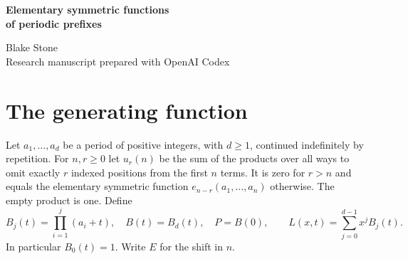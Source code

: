 \documentclass[11pt,letterpaper]{article}
\begin{document}
\thispagestyle{plain}
\begin{center}
{\LARGE\bfseries Elementary symmetric functions\\[0.15em] of periodic prefixes\par}
\vspace{0.6em}
Blake Stone\\
{\small Research manuscript prepared with OpenAI Codex}
\end{center}
\begin{abstract}
For a periodic list of positive integers, sum the products obtained by omitting a fixed number $r$ of positions from each prefix. We give the generating function and an exact recurrence order when the period product defines an irreducible binomial. Specialization to one omitted position establishes ten generating functions and recurrences proposed by R. J. Mathar for sequences of Clark Kimberling. One of the ten cases was verified by Robert Israel in 2017. For each of the ten periods the least order at any omission count $r$ is $d(r+1)$, where $d$ is the period length.
\end{abstract}

\section{The generating function}
Let $a_1,\ldots,a_d$ be a period of positive integers, with $d\ge1$, continued indefinitely by repetition. For $n,r\ge0$ let $u_r(n)$ be the sum of the products over all ways to omit exactly $r$ indexed positions from the first $n$ terms. It is zero for $r>n$ and equals the elementary symmetric function $e_{n-r}(a_1,\ldots,a_n)$ otherwise. The empty product is one. Define
\[
 B_j(t)=\prod_{i=1}^j(a_i+t),\quad B(t)=B_d(t),\quad P=B(0),\qquad
 L(x,t)=\sum_{j=0}^{d-1}x^j B_j(t).
\]
In particular $B_0(t)=1$. Write $E$ for the shift in $n$.
\end{document}
